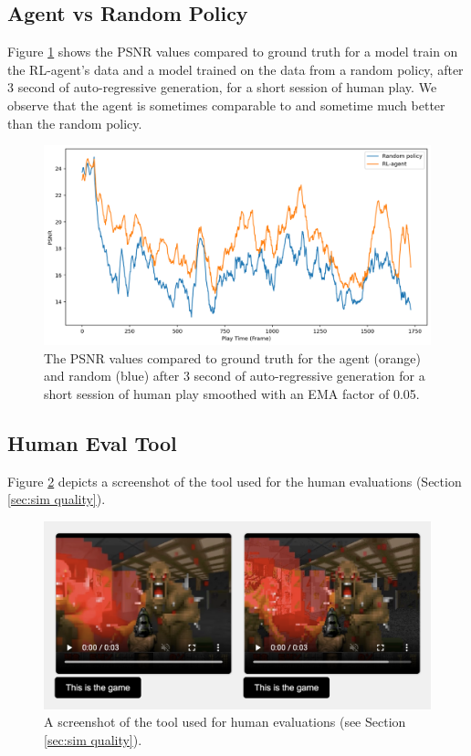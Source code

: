 \documentclass{article} %
\begin{document}
\subsection{Agent vs Random Policy}
\label{appendix:agent v random}

Figure \ref{fig:agent v random} shows the PSNR values compared to ground truth for a model train on the RL-agent's data and a model trained on the data from a random policy, after 3 second of auto-regressive generation, for a short session of human play. We observe that the agent is sometimes comparable to and sometime much better than the random policy.

\begin{figure}[ht]
    \centering
    \vspace{-0.1in}
    \includegraphics[width=\textwidth]{figures/psnr_over_trajectory.png}
    \caption{The PSNR values compared to ground truth for the agent (orange) and random (blue) after 3 second of auto-regressive generation for a short session of human play smoothed with an EMA factor of 0.05.}
    \label{fig:agent v random}
    \vspace{-0.05in}
\end{figure}

\subsection{Human Eval Tool}
\label{appendix:human eval}

Figure \ref{fig:eval tool} depicts a screenshot of the tool used for the human evaluations (Section \ref{sec:sim quality}).
\begin{figure}[ht]
    \centering
    \vspace{-0.1in}
    \includegraphics[width=\textwidth]{figures/eval_tool.png}
    \caption{A screenshot of the tool used for human evaluations (see Section \ref{sec:sim quality}).}
    \label{fig:eval tool}
    \vspace{-0.05in}
\end{figure}
\end{document}
